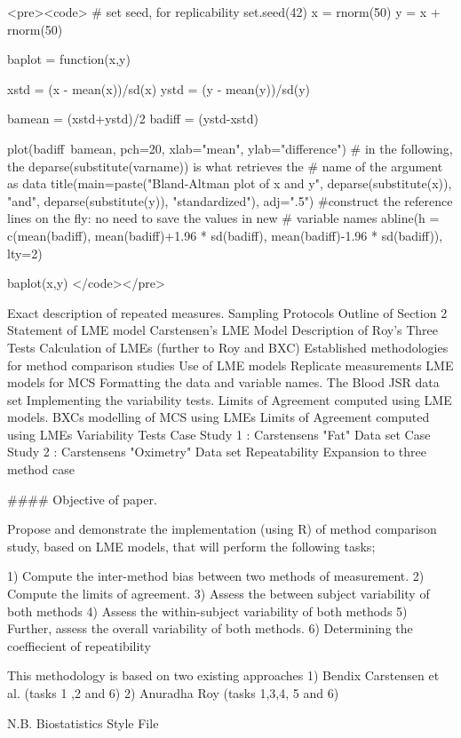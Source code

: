 
<pre><code>
# set seed, for replicability
set.seed(42)
x = rnorm(50)
y = x + rnorm(50) 

baplot = function(x,y){
  xstd = (x - mean(x))/sd(x)
  ystd = (y - mean(y))/sd(y)
  
  bamean = (xstd+ystd)/2
  badiff = (ystd-xstd)
  
  plot(badiff~bamean, pch=20, xlab="mean", ylab="difference")
# in the following, the deparse(substitute(varname)) is what retrieves the
# name of the argument as data
  title(main=paste("Bland-Altman plot of x and y\n",
    deparse(substitute(x)), "and", deparse(substitute(y)),
    "standardized"), adj=".5")
#construct the reference lines on the fly: no need to save the values in new 
# variable names
  abline(h = c(mean(badiff), mean(badiff)+1.96 * sd(badiff),
    mean(badiff)-1.96 * sd(badiff)), lty=2)
} 

baplot(x,y)
</code></pre>

Exact description of repeated measures.
Sampling Protocols
Outline of Section 2
Statement of LME model
Carstensen's LME Model
Description of Roy's Three Tests
Calculation of LMEs (further to Roy and BXC)
Established methodologies for method comparison studies
Use of LME models
Replicate measurements
LME models for MCS
Formatting the data and variable names.
The Blood JSR data set
Implementing the variability tests.
Limits of Agreement computed using LME models.
BXCs modelling of MCS using LMEs
Limits of Agreement computed using LMEs
Variability Tests
Case Study 1 : Carstensens "Fat" Data set
Case Study 2 : Carstensens "Oximetry" Data set
Repeatability
Expansion to three method case
 
 
#### Objective of paper.
 
Propose and demonstrate the implementation (using R) of method comparison study, based on LME models, that will perform the following tasks;
 
1) Compute the inter-method bias between two methods of measurement.
2) Compute the limits of agreement.
3) Assess the between subject variability of both methods
4) Assess the within-subject variability of both methods
5) Further, assess the overall variability of both methods.
6) Determining the coeffiecient of repeatibility
 
This methodology is based on two existing approaches
1) Bendix Carstensen et al.      (tasks 1 ,2 and 6)
2) Anuradha Roy                    (tasks 1,3,4, 5 and 6)
 
 
    N.B. Biostatistics Style File 
 
